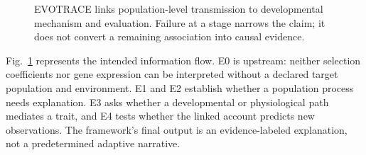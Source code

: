 \documentclass[conference]{IEEEtran}
\begin{document}
\begin{figure}[t]
\centering
{}
\caption{EVOTRACE links population-level transmission to developmental mechanism and evaluation. Failure at a stage narrows the claim; it does not convert a remaining association into causal evidence.}
\label{fig:evotrace}
\end{figure}

Fig.~\ref{fig:evotrace} represents the intended information flow. E0 is upstream: neither selection coefficients nor gene expression can be interpreted without a declared target population and environment. E1 and E2 establish whether a population process needs explanation. E3 asks whether a developmental or physiological path mediates a trait, and E4 tests whether the linked account predicts new observations. The framework's final output is an evidence-labeled explanation, not a predetermined adaptive narrative.
\end{document}
